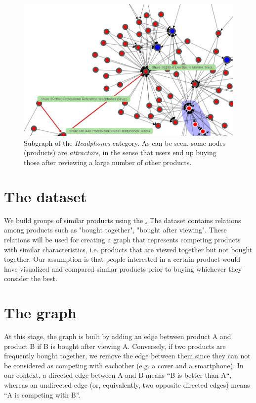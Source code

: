 \documentclass[a4paper,12pt]{article}
\begin{document}
\begin{figure}[H]
	\centering{}
	\includegraphics[width=\textwidth]{img/graph_nav.png}
	\caption{Subgraph of the \emph{Headphones} category. As can be seen, some nodes (products) are \emph{attractors}, in the sense that users end up buying those after reviewing a large number of other products.}
	\label{fig:graphNav}
\end{figure}

\section{The dataset}
We build groups of similar products using the \href{http://jmcauley.ucsd.edu/data/amazon/}. The dataset contains relations among products such as "bought together", "bought after viewing". These relations will be used for creating a graph that represents competing products with similar characteristics, i.e. products that are viewed together but not bought together. Our assumption is that people interested in a certain product would have visualized and compared similar products prior to buying whichever they consider the best.

\section{The graph}
At this stage, the graph is built by adding an edge between product A and product B if B is bought after viewing A. Conversely, if two products are frequently bought together, we remove the edge between them since they can not be considered as competing with eachother (e.g. a cover and a smartphone). In our context, a directed edge between A and B means ``B is better than A``, whereas an undirected edge (or, equivalently, two opposite directed edges) means ``A is competing with B''.
\end{document}
